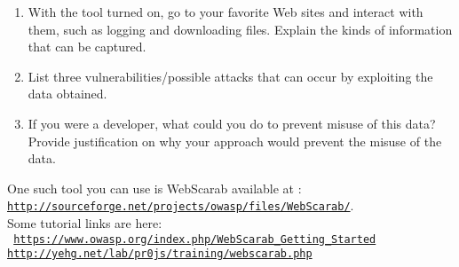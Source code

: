 \documentclass[11pt]{article}
\begin{document}
\begin{enumerate}
\item With the tool turned on, go to your favorite Web sites and interact with them, such as logging and downloading files. Explain the kinds of information that can be captured.

\item List three vulnerabilities/possible attacks that can occur by exploiting the data obtained.

\item If you were a developer, what could you do to prevent misuse of this data? Provide justification on why your approach would prevent the misuse of the data.

\end{enumerate}

\noindent One such tool you can use is WebScarab available at :\\ \href{http://sourceforge.net/projects/owasp/files/WebScarab/}{\texttt{http://sourceforge.net/projects/owasp/files/WebScarab/}}.\\
Some tutorial links are here:\\ \texttt{
\href{https://www.owasp.org/index.php/WebScarab\_Getting\_Started}{https://www.owasp.org/index.php/WebScarab\_Getting\_Started}\\
\href{http://yehg.net/lab/pr0js/training/webscarab.php}{http://yehg.net/lab/pr0js/training/webscarab.php\\}
}
\end{document}
